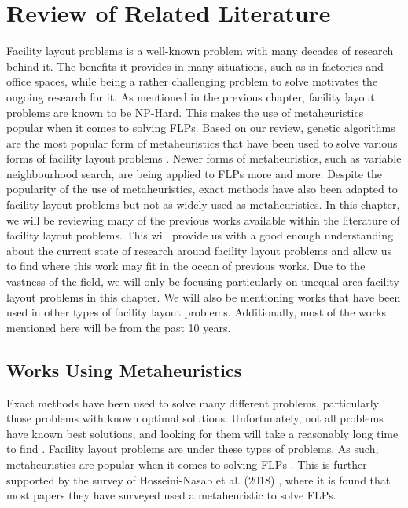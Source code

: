 \chapter{Review of Related Literature} \label{sec:rrl-title}
Facility layout problems is a well-known problem with many decades of research behind it. The benefits it provides in many situations, such as in factories and office spaces, while being a rather challenging problem to solve motivates the ongoing research for it. As mentioned in the previous chapter, facility layout problems are known to be NP-Hard. This makes the use of metaheuristics popular when it comes to solving FLPs. Based on our review, genetic algorithms are the most popular form of metaheuristics that have been used to solve various forms of facility layout problems  \cite{Hosseini-Nasab2018}. Newer forms of metaheuristics, such as variable neighbourhood search, are being applied to FLPs more and more. Despite the popularity of the use of metaheuristics, exact methods have also been adapted to facility layout problems but not as widely used as metaheuristics. In this chapter, we will be reviewing many of the previous works available within the literature of facility layout problems. This will provide us with a good enough understanding about the current state of research around facility layout problems and allow us to find where this work may fit in the ocean of previous works. Due to the vastness of the field, we will only be focusing particularly on unequal area facility layout problems in this chapter. We will also be mentioning works that have been used in other types of facility layout problems. Additionally, most of the works mentioned here will be from the past 10 years.

\section{Works Using Metaheuristics}
Exact methods have been used to solve many different problems, particularly those problems with known optimal solutions. Unfortunately, not all problems have known best solutions, and looking for them will take a reasonably long time to find \cite{Glover2015}. Facility layout problems are under these types of problems. As such, metaheuristics are popular when it comes to solving FLPs \cite{Drira2007}. This is further supported by the survey of Hosseini-Nasab et al. (2018) \cite{Hosseini-Nasab2018}, where it is found that most papers they have surveyed used a metaheuristic to solve FLPs.


